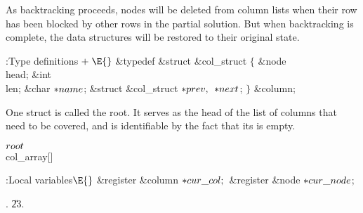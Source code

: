 As backtracking proceeds, nodes
will be deleted from column lists when their row has been blocked by
other rows in the partial solution.
But when backtracking is complete, the data structures will be
restored to their original state.

\Y\B\4:Type definitions\X${}\mathrel+\E{}$\6
\&{typedef} \&{struct} \&{col\_struct} ${}\{{}$\1\6
\&{node} \\{head};\6
\&{int} \\{len};\6
\&{char} ${}{*}\\{name}{}$;\6
\&{struct} \&{col\_struct} ${}{*}\\{prev},{}$ ${}{*}\\{next}{}$;\2\6
${}\}{}$ \&{column};\par
\fi

One  struct is called the root. It
serves as the head of the
list of columns that need to be covered, and is identifiable by the fact
that its  is empty.

\Y\B\4\D$\\{root}$ \5
\\{col\_array}[]\par
\Y\B\4:Local variables\X${}\E{}$\6
\&{register} \&{column} ${}{*}\\{cur\_col};{}$\6
\&{register} \&{node} ${}{*}\\{cur\_node}{}$;\par
{}.
\U23.\fi

